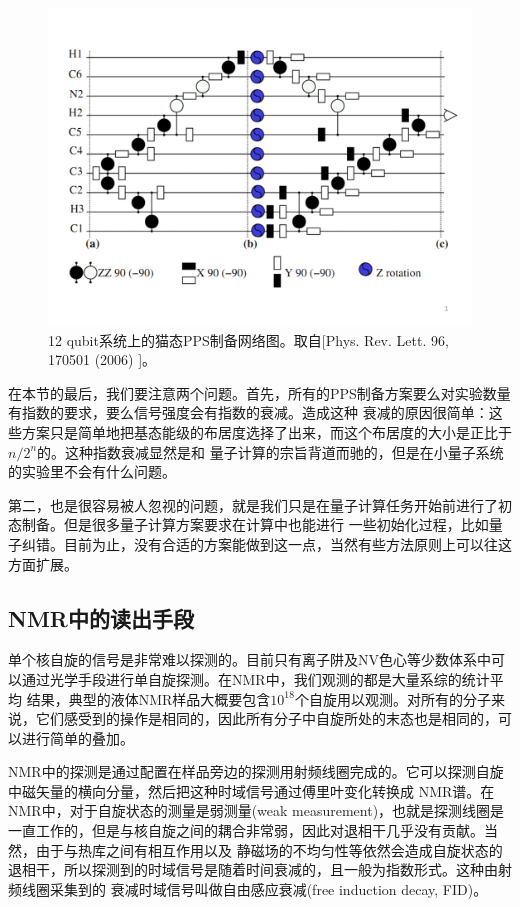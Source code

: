 \begin{figure}[htbp]
            \begin{center}
              \includegraphics[width= 0.8\columnwidth]{figures/cat12.pdf}
              \caption{12 qubit系统上的猫态PPS制备网络图。取自[Phys. Rev. Lett. 96, 170501 (2006) \cite{12qubit}]。
              }
              \label{cat12}
            \end{center}
\end{figure}

在本节的最后，我们要注意两个问题。首先，所有的PPS制备方案要么对实验数量有指数的要求，要么信号强度会有指数的衰减。造成这种
衰减的原因很简单：这些方案只是简单地把基态能级的布居度选择了出来，而这个布居度的大小是正比于$n/2^n$的。这种指数衰减显然是和
量子计算的宗旨背道而驰的，但是在小量子系统的实验里不会有什么问题。

第二，也是很容易被人忽视的问题，就是我们只是在量子计算任务开始前进行了初态制备。但是很多量子计算方案要求在计算中也能进行
一些初始化过程，比如量子纠错。目前为止，没有合适的方案能做到这一点，当然有些方法原则上可以往这方面扩展。

\subsection{NMR中的读出手段}

单个核自旋的信号是非常难以探测的。目前只有离子阱及NV色心等少数体系中可以通过光学手段进行单自旋探测。在NMR中，我们观测的都是大量系综的统计平均
结果，典型的液体NMR样品大概要包含$10^{18}$个自旋用以观测。对所有的分子来说，它们感受到的操作是相同的，因此所有分子中自旋所处的末态也是相同的，可以进行简单的叠加。

NMR中的探测是通过配置在样品旁边的探测用射频线圈完成的。它可以探测自旋中磁矢量的横向分量，然后把这种时域信号通过傅里叶变化转换成
NMR谱。在NMR中，对于自旋状态的测量是弱测量(weak measurement)，也就是探测线圈是一直工作的，但是与核自旋之间的耦合非常弱，因此对退相干几乎没有贡献。当然，由于与热库之间有相互作用以及
静磁场的不均匀性等依然会造成自旋状态的退相干，所以探测到的时域信号是随着时间衰减的，且一般为指数形式。这种由射频线圈采集到的
衰减时域信号叫做自由感应衰减(free induction decay, FID)。

